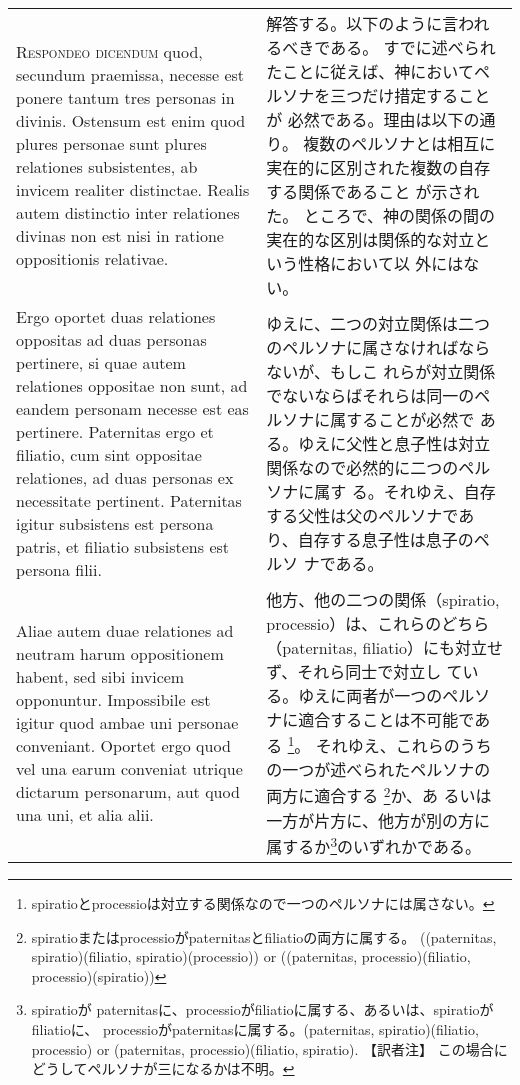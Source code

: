 \documentclass[10pt]{jsarticle} %
\begin{document}
\begin{longtable}{p{21em}p{21em}}
\\



{\scshape Respondeo dicendum} quod, secundum praemissa, necesse est ponere tantum
tres personas in divinis. Ostensum est enim quod plures personae sunt
plures relationes subsistentes, ab invicem realiter distinctae. Realis
autem distinctio inter relationes divinas non est nisi in ratione
oppositionis relativae. 



&

解答する。以下のように言われるべきである。
すでに述べられたことに従えば、神においてペルソナを三つだけ措定することが
 必然である。理由は以下の通り。
複数のペルソナとは相互に実在的に区別された複数の自存する関係であること
 が示された。
ところで、神の関係の間の実在的な区別は関係的な対立という性格において以
 外にはない。


\\



Ergo oportet duas relationes oppositas ad duas
personas pertinere, si quae autem relationes oppositae non sunt, ad
eandem personam necesse est eas pertinere. Paternitas ergo et
filiatio, cum sint oppositae relationes, ad duas personas ex
necessitate pertinent. Paternitas igitur subsistens est persona
patris, et filiatio subsistens est persona filii.


&

ゆえに、二つの対立関係は二つのペルソナに属さなければならないが、もしこ
 れらが対立関係でないならばそれらは同一のペルソナに属することが必然で
 ある。ゆえに父性と息子性は対立関係なので必然的に二つのペルソナに属す
 る。それゆえ、自存する父性は父のペルソナであり、自存する息子性は息子のペルソ
 ナである。


\\




 Aliae autem duae
relationes ad neutram harum oppositionem habent, sed sibi invicem
opponuntur. Impossibile est igitur quod ambae uni personae
conveniant. 
Oportet ergo quod vel una earum conveniat utrique dictarum
personarum, aut quod una uni, et alia alii.

&

他方、他の二つの関係（spiratio, processio）は、これらのどちら
 （paternitas, filiatio）にも対立せず、それら同士で対立し
 ている。ゆえに両者が一つのペルソナに適合することは不可能である
 \footnote{spiratioとprocessioは対立する関係なので一つのペルソナには属さない。}。
それゆえ、これらのうちの一つが述べられたペルソナの両方に適合する
 \footnote{spiratioまたはprocessioがpaternitasとfiliatioの両方に属する。
 ((paternitas, spiratio)(filiatio, spiratio)(processio)) or
 ((paternitas, processio)(filiatio, processio)(spiratio))}か、あ
 るいは一方が片方に、他方が別の方に属するか\footnote{spiratioが
 paternitasに、processioがfiliatioに属する、あるいは、spiratioがfiliatioに、
 processioがpaternitasに属する。(paternitas, spiratio)(filiatio,
 processio) or (paternitas, processio)(filiatio, spiratio). 【訳者注】
 この場合にどうしてペルソナが三になるかは不明。}のいずれかである。


\end{longtable}
\end{document}
